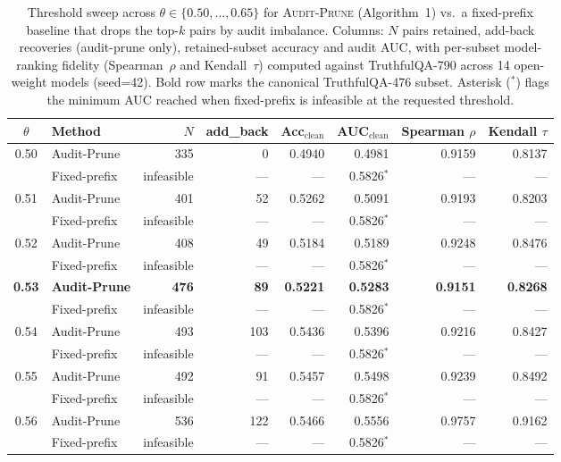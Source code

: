 \begin{table}[t]
\centering
\small
\caption{Threshold sweep across $\theta \in \{0.50, \ldots, 0.65\}$ for \textsc{Audit-Prune} (Algorithm~1) vs.\ a fixed-prefix baseline that drops the top-$k$ pairs by audit imbalance. Columns: $N$ pairs retained, add-back recoveries (audit-prune only), retained-subset accuracy and audit AUC, with per-subset model-ranking fidelity (Spearman~$\rho$ and Kendall~$\tau$) computed against TruthfulQA-790 across 14 open-weight models (seed=42). Bold row marks the canonical TruthfulQA-476 subset. Asterisk ($^{*}$) flags the minimum AUC reached when fixed-prefix is infeasible at the requested threshold.}
\label{tab:t5c_sweep_with_fidelity_surface6}
\begin{tabular}{c l r r r r r r}
\toprule
$\theta$ & Method & $N$ & add\_back & Acc$_\text{clean}$ & AUC$_\text{clean}$ & Spearman $\rho$ & Kendall $\tau$ \\
\midrule
  0.50 & Audit-Prune & 335 & 0 & 0.4940 & 0.4981 & 0.9159 & 0.8137 \\
   & Fixed-prefix & infeasible & — & — & 0.5826$^{*}$ & — & — \\
\midrule
  0.51 & Audit-Prune & 401 & 52 & 0.5262 & 0.5091 & 0.9193 & 0.8203 \\
   & Fixed-prefix & infeasible & — & — & 0.5826$^{*}$ & — & — \\
\midrule
  0.52 & Audit-Prune & 408 & 49 & 0.5184 & 0.5189 & 0.9248 & 0.8476 \\
   & Fixed-prefix & infeasible & — & — & 0.5826$^{*}$ & — & — \\
\midrule
  \textbf{0.53} & \textbf{Audit-Prune} & \textbf{476} & \textbf{89} & \textbf{0.5221} & \textbf{0.5283} & \textbf{0.9151} & \textbf{0.8268} \\
   & Fixed-prefix & infeasible & — & — & 0.5826$^{*}$ & — & — \\
\midrule
  0.54 & Audit-Prune & 493 & 103 & 0.5436 & 0.5396 & 0.9216 & 0.8427 \\
   & Fixed-prefix & infeasible & — & — & 0.5826$^{*}$ & — & — \\
\midrule
  0.55 & Audit-Prune & 492 & 91 & 0.5457 & 0.5498 & 0.9239 & 0.8492 \\
   & Fixed-prefix & infeasible & — & — & 0.5826$^{*}$ & — & — \\
\midrule
  0.56 & Audit-Prune & 536 & 122 & 0.5466 & 0.5556 & 0.9757 & 0.9162 \\
   & Fixed-prefix & infeasible & — & — & 0.5826$^{*}$ & — & — \\

\end{tabular}
\end{table}

